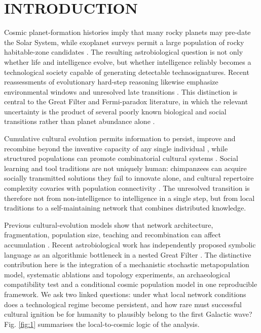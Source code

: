 \documentclass{article_saj}
\renewcommand{\thefootnote}{\fnsymbol{footnote}}
\begin{document}
\tenrm
\indent{}
\renewcommand{\thefootnote}{\arabic{footnote}}

\section{INTRODUCTION}

Cosmic planet-formation histories imply that many rocky planets may pre-date the Solar System, while exoplanet surveys permit a large population of rocky habitable-zone candidates \citep{behroozi2015,bryson2021}. The resulting astrobiological question is not only whether life and intelligence evolve, but whether intelligence reliably becomes a technological society capable of generating detectable technosignatures. Recent reassessments of evolutionary hard-step reasoning likewise emphasize environmental windows and unresolved late transitions \citep{mills2025}. This distinction is central to the Great Filter and Fermi-paradox literature, in which the relevant uncertainty is the product of several poorly known biological and social transitions rather than planet abundance alone \citep{kipping2020,schleicher2023,shkurko2024}.

Cumulative cultural evolution permits information to persist, improve and recombine beyond the inventive capacity of any single individual \citep{mesoudi2018}, while structured populations can promote combinatorial cultural systems \citep{kirby2022}. Social learning and tool traditions are not uniquely human: chimpanzees can acquire socially transmitted solutions they fail to innovate alone, and cultural repertoire complexity covaries with population connectivity \citep{vanleeuwen2024,gunasekaram2024}. The unresolved transition is therefore not from non-intelligence to intelligence in a single step, but from local traditions to a self-maintaining network that combines distributed knowledge.

Previous cultural-evolution models show that network architecture, fragmentation, population size, teaching and recombination can affect accumulation \citep{derex2015,derex2018,cantor2021}. Recent astrobiological work has independently proposed symbolic language as an algorithmic bottleneck in a nested Great Filter \citep{prokopenko2026}. The distinctive contribution here is the integration of a mechanistic stochastic metapopulation model, systematic ablations and topology experiments, an archaeological compatibility test and a conditional cosmic population model in one reproducible framework. We ask two linked questions: under what local network conditions does a technological regime become persistent, and how rare must successful cultural ignition be for humanity to plausibly belong to the first Galactic wave? Fig. \ref{fig:1} summarises the local-to-cosmic logic of the analysis.
\end{document}
